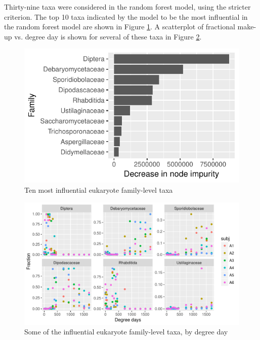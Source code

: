 \documentclass{article}
\begin{document}
Thirty-nine taxa were considered in the random forest model, using the
stricter criterion.  The top 10 taxa indicated by the model to be the
most influential in the random forest model are shown in Figure
\ref{fig:infl_eukaryote_family_taxa_orig_crit}.  A scatterplot of
fractional make-up vs. degree day is shown for several of these taxa
in Figure \ref{fig:scatter_eukaryote_family_taxa}.

\begin{figure}
  \centering
  \includegraphics{../../../eukaryote_data/only_families/all_time_steps/hit_1perc_twice/orig_units_all_data_families_barchart}
  \caption{Ten most influential eukaryote family-level taxa}
  \label{fig:infl_eukaryote_family_taxa_orig_crit}
\end{figure}

\begin{figure}
  \centering
  \includegraphics{../../../eukaryote_data/only_families/all_time_steps/influential_family_taxa_panel}
  \caption{Some of the influential eukaryote family-level taxa, by degree day}
  \label{fig:scatter_eukaryote_family_taxa}
\end{figure}
\end{document}
